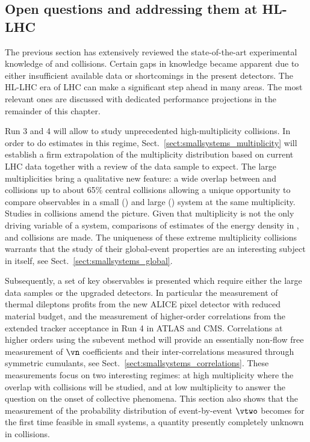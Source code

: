 \documentclass[../report.tex]{subfiles}
\begin{document}
\subsection{Open questions and addressing them at HL-LHC}
\label{sect:smallsystems_openquestions}

The previous section has extensively reviewed the state-of-the-art experimental knowledge of \pp and \pPb collisions. Certain gaps in knowledge became apparent due to either insufficient available data or shortcomings in the present detectors. The HL-LHC era of LHC can make a significant step ahead in many areas. The most relevant ones are discussed with dedicated performance projections in the remainder of this chapter.

Run 3 and 4 will allow to study unprecedented high-multiplicity \pp collisions. In order to do estimates in this regime, Sect.~\ref{sect:smallsystems_multiplicity} will establish a firm extrapolation of the multiplicity distribution based on current LHC data together with a review of the data sample to expect. The large multiplicities bring a qualitative new feature: a wide overlap between \pp and \PbPb collisions up to about 65\% central collisions allowing a unique opportunity to compare observables in a small (\pp) and large (\PbPb) system at the same multiplicity. Studies in \pPb collisions amend the picture. Given that multiplicity is not the only driving variable of a system, comparisons of estimates of the energy density in \pp, \pPb and \PbPb collisions are made. The uniqueness of these extreme multiplicity \pp collisions warrants that the study of their global-event properties are an interesting subject in itself, see Sect.~\ref{sect:smallsystems_global}.

Subsequently, a set of key observables is presented which require either the large data samples or the upgraded detectors. In particular the measurement of thermal dileptons profits from the new ALICE pixel detector with reduced material budget, and the measurement of higher-order correlations from the extended tracker acceptance in Run 4 in ATLAS and CMS. Correlations at higher orders using the subevent method will provide an essentially non-flow free measurement of $\vn$ coefficients and their inter-correlations measured through symmetric cumulants, see Sect.~\ref{sect:smallsystems_correlations}. These measurements focus on two interesting regimes: at high multiplicity where the overlap with \PbPb collisions will be studied, and at low multiplicity to answer the question on the onset of collective phenomena.
This section also shows that the measurement of the probability distribution of event-by-event $\vtwo$ becomes for the first time feasible in small systems, a quantity presently completely unknown in \pp collisions.
\end{document}

